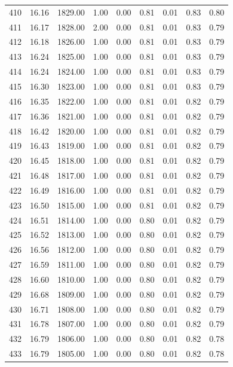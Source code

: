 \documentclass{article}\usepackage[]{graphicx}\usepackage[]{color}
\begin{document}
\begin{longtable}{rrrrrrrrr}
  410 & 16.16 & 1829.00 & 1.00 & 0.00 & 0.81 & 0.01 & 0.83 & 0.80 \\ 
  411 & 16.17 & 1828.00 & 2.00 & 0.00 & 0.81 & 0.01 & 0.83 & 0.79 \\ 
  412 & 16.18 & 1826.00 & 1.00 & 0.00 & 0.81 & 0.01 & 0.83 & 0.79 \\ 
  413 & 16.24 & 1825.00 & 1.00 & 0.00 & 0.81 & 0.01 & 0.83 & 0.79 \\ 
  414 & 16.24 & 1824.00 & 1.00 & 0.00 & 0.81 & 0.01 & 0.83 & 0.79 \\ 
  415 & 16.30 & 1823.00 & 1.00 & 0.00 & 0.81 & 0.01 & 0.83 & 0.79 \\ 
  416 & 16.35 & 1822.00 & 1.00 & 0.00 & 0.81 & 0.01 & 0.82 & 0.79 \\ 
  417 & 16.36 & 1821.00 & 1.00 & 0.00 & 0.81 & 0.01 & 0.82 & 0.79 \\ 
  418 & 16.42 & 1820.00 & 1.00 & 0.00 & 0.81 & 0.01 & 0.82 & 0.79 \\ 
  419 & 16.43 & 1819.00 & 1.00 & 0.00 & 0.81 & 0.01 & 0.82 & 0.79 \\ 
  420 & 16.45 & 1818.00 & 1.00 & 0.00 & 0.81 & 0.01 & 0.82 & 0.79 \\ 
  421 & 16.48 & 1817.00 & 1.00 & 0.00 & 0.81 & 0.01 & 0.82 & 0.79 \\ 
  422 & 16.49 & 1816.00 & 1.00 & 0.00 & 0.81 & 0.01 & 0.82 & 0.79 \\ 
  423 & 16.50 & 1815.00 & 1.00 & 0.00 & 0.81 & 0.01 & 0.82 & 0.79 \\ 
  424 & 16.51 & 1814.00 & 1.00 & 0.00 & 0.80 & 0.01 & 0.82 & 0.79 \\ 
  425 & 16.52 & 1813.00 & 1.00 & 0.00 & 0.80 & 0.01 & 0.82 & 0.79 \\ 
  426 & 16.56 & 1812.00 & 1.00 & 0.00 & 0.80 & 0.01 & 0.82 & 0.79 \\ 
  427 & 16.59 & 1811.00 & 1.00 & 0.00 & 0.80 & 0.01 & 0.82 & 0.79 \\ 
  428 & 16.60 & 1810.00 & 1.00 & 0.00 & 0.80 & 0.01 & 0.82 & 0.79 \\ 
  429 & 16.68 & 1809.00 & 1.00 & 0.00 & 0.80 & 0.01 & 0.82 & 0.79 \\ 
  430 & 16.71 & 1808.00 & 1.00 & 0.00 & 0.80 & 0.01 & 0.82 & 0.79 \\ 
  431 & 16.78 & 1807.00 & 1.00 & 0.00 & 0.80 & 0.01 & 0.82 & 0.79 \\ 
  432 & 16.79 & 1806.00 & 1.00 & 0.00 & 0.80 & 0.01 & 0.82 & 0.78 \\ 
  433 & 16.79 & 1805.00 & 1.00 & 0.00 & 0.80 & 0.01 & 0.82 & 0.78 \\ 

\end{longtable}
\end{document}
